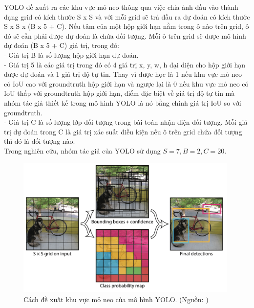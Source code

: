 {    \noindent
    YOLO đề xuất ra các khu vực mỏ neo thông qua việc chia ảnh đầu vào thành dạng grid có kích thước S x S và với mỗi grid sẽ trả đầu ra dự đoán có kích thước S x S x (B x 5 + C).
    Nếu tâm của một hộp giới hạn nằm trong ô nào trên grid, ô đó sẽ cần phải được dự đoán là chứa đối tượng.
    Mỗi ô trên grid sẽ được mô hình dự đoán (B x 5 + C) giá trị, trong đó: \\
    - Giá trị B là số lượng hộp giới hạn dự đoán. \\
    - Giá trị 5 là các giá trị trong đó có 4 giá trị x, y, w, h đại diện cho hộp giới hạn được dự đoán và 1 giá trị độ tự tin.
    Thay vì được học là 1 nếu khu vực mỏ neo có IoU cao với groundtruth hộp giới hạn và ngược lại là 0 nếu khu vực mỏ neo có IoU thấp với groundtruth hộp giới hạn, điểm đặc biệt về giá trị độ tự tin mà nhóm tác giả thiết kế trong mô hình YOLO là nó bằng chính giá trị IoU so với groundtruth. \\
    - Giá trị C là số lượng lớp đối tượng trong bài toán nhận diện đối tượng.
    Mỗi giá trị dự đoán trong C là giá trị xác suất điều kiện nếu ô trên grid chứa đối tượng thì đó là đối tượng nào. \\
    Trong nghiên cứu, nhóm tác giả của YOLO sử dụng $S = 7, B = 2, C = 20$.

    \begin{figure}[H]
        \centering
        \includegraphics[width=11cm] {images/yolo_anchor}
        \caption{Cách đề xuất khu vực mỏ neo của mô hình YOLO. (Nguồn: \cite{redmon2016look})}
        \label{fig:yolo_anchor}
    \end{figure}

}
